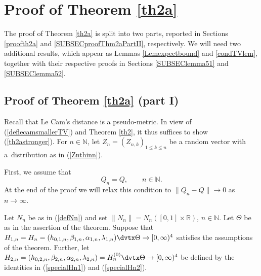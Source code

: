 \documentclass[number,citesort,seceqn,dvips]{arxbj}
\newcommand{\eqref}[1]{(\ref{#1})}
\newcommand{\RR}{\mathbb{R}}
\newcommand{\NN}{\mathbb{N}}
\begin{document}
\section{\texorpdfstring{Proof of Theorem \protect\ref{th2a}}{Proof of Theorem 2.2}}
\vspace*{2pt}\label{proofB}
The proof of Theorem \ref{th2a} is split into two parts, reported in
Sections \ref{proofth2a} and \ref{SUBSECproofThm2aPartII},
respectively. We will need two additional results, which appear as
Lemmas \ref{Lemexpectbound} and \ref{condTVlem}, together with their respective proofs in
Sections \ref{SUBSEClemma51} and \ref{SUBSEClemma52}.
%
\vspace*{2pt}\subsection{\texorpdfstring{Proof of Theorem \protect\ref{th2a} (part I)}
{Proof of Theorem 2.2 (part I)}}\vspace*{2pt}\label{proofth2a}
Recall that Le Cam's distance is a pseudo-metric. In view of
\eqref{deflecamsmallerTV} and Theorem \ref{th2}, it thus suffices to
show \eqref{th2astronger}. For $n\in\NN$, let $Z_n=(Z_{n,k})_{1\le
k\le
n}$ be a random vector with a~distribution as in \eqref{Znthinn}.

First, we assume that
%
\begin{equation}\label{QnequalsQ}
Q_n = Q ,\qquad  n\in\NN .
\end{equation}
%
At the end of the proof we will relax this condition to $\|Q_n-Q\|\to
0$ as $n\to\infty$.

Let $N_n$ be as in \eqref{defNn} and set $\|N_n\|=N_n([0,1]\times
\RR)$, $n\in\NN$. Let $\Theta$ be as in the assertion of the theorem.
Suppose that
$H_{1,n}=H_n=(h_{0,1,n},\beta_{1,n},\alpha_{1,n},\lambda
_{1,n})\dvtx\Theta\to[0,\infty)^4
$ satisfies the assumptions of the theorem. Further, let
$H_{2,n}=(h_{0,2,n},\beta_{2,n},\alpha_{2,n},\lambda
_{2,n})=H_{n}^{(0)}\dvtx\Theta\to[0,\infty)^4
$ be defined by the identities in
\eqref{specialHn1} and \eqref{specialHn2}.
\end{document}
